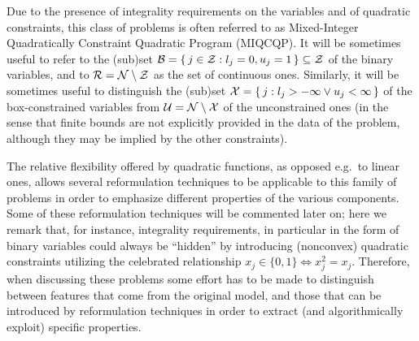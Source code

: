 %
Due to the presence of integrality requirements on the variables and of quadratic constraints, this class of problems is often referred to as Mixed-Integer Quadratically Constraint Quadratic Program (MIQCQP). It will be sometimes useful to refer to the (sub)set $\mathcal{B} =  \{ \, j \in \mathcal{Z} : l_j = 0 , u_j = 1 \, \} \subseteq \mathcal{Z}$ of the binary variables, and to $\mathcal{R} = \mathcal{N} \setminus \mathcal{Z}$ as the set of continuous ones. Similarly, it will be sometimes useful to distinguish the (sub)set $\mathcal{X} = \{ \, j : l_j > -\infty \lor u_j < \infty \, \}$ of the box-constrained variables from $\mathcal{U} = \mathcal{N} \setminus \mathcal{X}$ of the unconstrained ones (in the sense that finite bounds are not explicitly provided in the data of the problem, although they may be implied by the other constraints).

The relative flexibility offered by quadratic functions, as opposed e.g.~to linear ones, allows several reformulation techniques to be applicable to this family of problems in order to emphasize different properties of the various components. Some of these reformulation techniques will be commented later on; here we remark that, for instance, integrality requirements, in particular in the form of binary variables could always be ``hidden'' by introducing (nonconvex) quadratic constraints utilizing the celebrated relationship $x_j \in \{0, 1\} \iff x_j^2 = x_j$. Therefore, when discussing these problems some effort has to be made to distinguish between features that come from the original model, and those that can be introduced by reformulation techniques in order to extract (and algorithmically exploit) specific properties.




